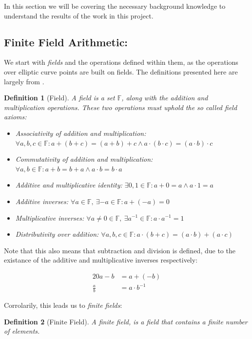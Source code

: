 \documentclass{article}
\newtheorem{definition}{Definition}[section]
\newcommand{\eq}[1]{\begin{alignat*}{20}#1\end{alignat*}}
\newcommand{\F}{\mathbb{F}}
\begin{document}
In this section we will be covering the necessary background knowledge
to understand the results of the work in this project.

\subsection{Finite Field Arithmetic:} \label{Finite Field Arithmetic}

We start with \textit{fields} and the operations defined within
them, as the operations over elliptic
curve points are built on fields. The definitions presented here are largely
from \cite{elliptic-curves}.

\begin{definition}[Field]
	A field is a set $\F$, along with the \textit{addition} and
	\textit{multiplication} operations. These two operations must
	uphold the so called \textit{field axioms}:

	\begin{itemize}
		\item Associativity of addition and multiplication:
		$\forall a,b,c \in \F : a + (b + c) = (a + b) + c \land a \cdot (b \cdot c) = (a \cdot b) \cdot c$
		\item Commutativity of addition and multiplication:
		$\forall a,b \in \F : a+b=b+a \land a \cdot b = b \cdot a$
		\item Additive and multiplicative identity:
		$\exists 0,1 \in \F : a + 0 = a \land a \cdot 1 = a$
		\item Additive inverses:
		$\forall a \in \F,\ \exists {-a} \in \F : a + ({-a}) = 0$
		\item Multiplicative inverses:
		$\forall a \neq 0 \in \F,\  \exists a^{-1} \in \F : a \cdot a^{-1} = 1$
		\item Distributivity over addition:
		$\forall a,b,c \in \F : a \cdot (b + c) = (a \cdot b) + (a \cdot c)$
	\end{itemize}
\end{definition}

Note that this also means that subtraction and division is defined,
due to the existance of the additive and multiplicative inverses
respectively:

\eq{
	a-b         &= a + (-b) \\
	\frac{a}{b} &= a \cdot b^{-1}
}

Corrolarily, this leads us to \textit{finite fields}:

\begin{definition}[Finite Field]
	A finite field, is a field that contains a finite number of elements.
\end{definition}
\end{document}
